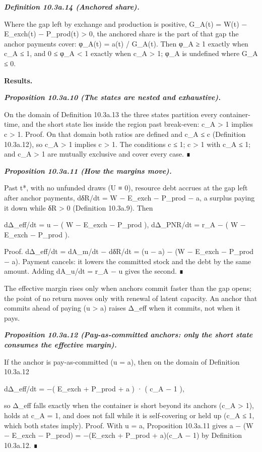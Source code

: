 \documentclass[
]{article}
\begin{document}
\emph{\textbf{Definition 10.3a.14 (Anchored share).}}

Where the gap left by exchange and production is positive, G\_A(t) =
W(t) − E\_exch(t) − P\_prod(t) \textgreater{} 0, the anchored share is
the part of that gap the anchor payments cover: φ\_A(t) = a(t) /
G\_A(t). Then φ\_A ≥ 1 exactly when c\_A ≤ 1, and 0 ≤ φ\_A \textless{} 1
exactly when c\_A \textgreater{} 1; φ\_A is undefined where G\_A ≤ 0.

\textbf{Results.}

\emph{\textbf{Proposition 10.3a.10 (The states are nested and
exhaustive).}}

On the domain of Definition 10.3a.13 the three states partition every
container-time, and the short state lies inside the region past
break-even: c\_A \textgreater{} 1 implies c \textgreater{} 1. Proof. On
that domain both ratios are defined and c\_A ≤ c (Definition 10.3a.12),
so c\_A \textgreater{} 1 implies c \textgreater{} 1. The conditions c ≤
1; c \textgreater{} 1 with c\_A ≤ 1; and c\_A \textgreater{} 1 are
mutually exclusive and cover every case. ∎

\emph{\textbf{Proposition 10.3a.11 (How the margins move).}}

Past t*, with no unfunded draws (U ≡ 0), resource debt accrues at the
gap left after anchor payments, dδR/dt = W − E\_exch − P\_prod − a, a
surplus paying it down while δR \textgreater{} 0 (Definition 10.3a.9).
Then

dΔ\_eff/dt = u − ( W − E\_exch − P\_prod ), dΔ\_PNR/dt = r\_A − ( W −
E\_exch − P\_prod ).

Proof. dΔ\_eff/dt = dA\_m/dt − dδR/dt = (u − a) − (W − E\_exch − P\_prod
− a). Payment cancels: it lowers the committed stock and the debt by the
same amount. Adding dA\_u/dt = r\_A − u gives the second. ∎

The effective margin rises only when anchors commit faster than the gap
opens; the point of no return moves only with renewal of latent
capacity. An anchor that commits ahead of paying (u \textgreater{} a)
raises Δ\_eff when it commits, not when it pays.

\emph{\textbf{Proposition 10.3a.12 (Pay-as-committed anchors: only the
short state consumes the effective margin).}}

If the anchor is pay-as-committed (u = a), then on the domain of
Definition 10.3a.12

dΔ\_eff/dt = −( E\_exch + P\_prod + a ) · ( c\_A − 1 ),

so Δ\_eff falls exactly when the container is short beyond its anchors
(c\_A \textgreater{} 1), holds at c\_A = 1, and does not fall while it
is self-covering or held up (c\_A ≤ 1, which both states imply). Proof.
With u = a, Proposition 10.3a.11 gives a − (W − E\_exch − P\_prod) =
−(E\_exch + P\_prod + a)(c\_A − 1) by Definition 10.3a.12. ∎
\end{document}

